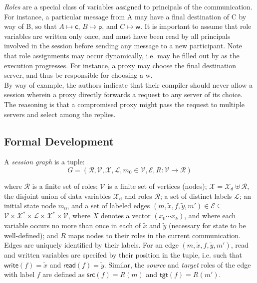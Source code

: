 \documentclass[a4paper,10pt]{article}
\begin{document}
\emph{Roles} are a special class of variables assigned to principals of the communication.
For instance, a particular message from A may have a final destination of C by way of B, so that
$A \mapsto \textsf{c}$, $B \mapsto \textsf{p}$, and $C \mapsto \textsf{w}$.  It is important to
assume that role variables are written only once, and must have been read by all principals involved
in the session before sending any message to a new participant.  Note that role assignments may
occur dynamically, i.e. may be filled out by as the execution progresses.  For instance, a proxy
may choose the final destination server, and thus be responsible for choosing a \textsf{w}.\\

By way of example, the authors indicate that their compiler should never allow a session wherein
a proxy directly forwards a request to any server of its choice.  The reasoning is that a compromised
proxy might pass the request to multiple servers and select among the replies.

\subsection{Formal Development}

A \emph{session graph} is a tuple:\\

\[
 G = (\mathcal{R}, \mathcal{V}, \mathcal{X}, \mathcal{L}, m_0 \in \mathcal{V}, \mathcal{E},
  R : \mathcal{V} \rightarrow \mathcal {R})
\]

where $\mathcal{R}$ is a finite set of roles; $\mathcal{V}$ is a finite set of vertices (nodes);
$\mathcal{X} = \mathcal{X}_{\textsf{d}} \uplus \mathcal{R}$, the disjoint union of data variables
$\mathcal{X}_\textsf{d}$ and roles $\mathcal{R}$; a set of distinct labels $\mathcal{L}$; an initial state node $m_0$,
and a set of labeled edges $(m, \tilde{x}, f, \tilde{y}, m\prime) \in \mathcal{E} \subseteq$
$ \mathcal{V} \times \mathcal{X}^* \times \mathcal{L} \times \mathcal{X}^* \times \mathcal{V}$, where
$\tilde{X}$ denotes a vector $(x_0 \cdots x_k)$, and where each variable occurs no more than once
in each of $\tilde{x}$ and $\tilde{y}$ (necessary for state to be well-defined); and $R$ maps nodes
to their roles in the current communication.\\

Edges are uniquely identified by their labels.  For an edge $(m, \tilde{x}, f, \tilde{y}, m\prime)$,
read and written variables are specifed by their position in the tuple, i.e. such that
$\textsf{write}(f) = \tilde{x}$ and $\textsf{read}(f) = \tilde{y}$.  Similar, the \emph{source}
and \emph{target} roles of the edge with label $f$ are defined as $\textsf{src}(f) = R(m)$ and
$\textsf{tgt}(f) = R(m\prime)$.\\
\end{document}

